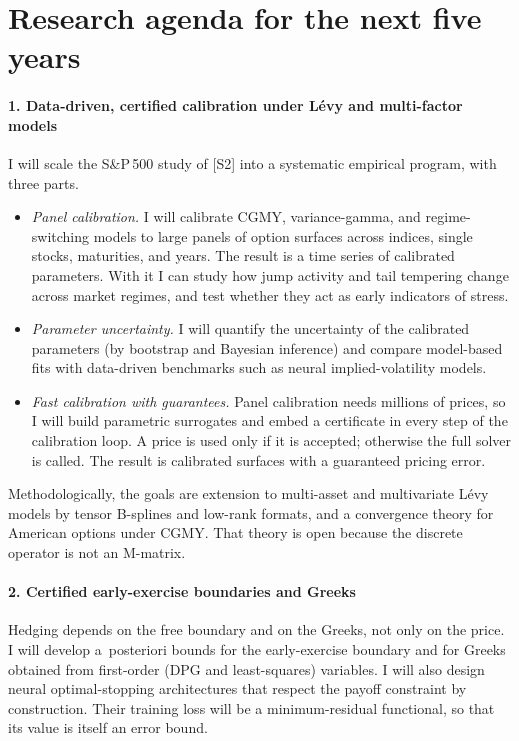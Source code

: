 \documentclass[11pt]{article}
\newcommand{\rc}[1]{\textcolor{accent}{[#1]}}
\begin{document}
\section{Research agenda for the next five years}

\paragraph{1. Data-driven, certified calibration under L\'evy and multi-factor models}
I will scale the S\&P\,500 study of \rc{S2} into a systematic empirical
program, with three parts.
\begin{itemize}
\item \emph{Panel calibration.} I will calibrate CGMY, variance-gamma, and
      regime-switching models to large panels of option surfaces across
      indices, single stocks, maturities, and years. The result is a time
      series of calibrated parameters. With it I can study how jump
      activity and tail tempering change across market regimes, and test
      whether they act as early indicators of stress.
\item \emph{Parameter uncertainty.} I will quantify the uncertainty of the
      calibrated parameters (by bootstrap and Bayesian inference) and
      compare model-based fits with data-driven benchmarks such as neural
      implied-volatility models.
\item \emph{Fast calibration with guarantees.} Panel calibration needs
      millions of prices, so I will build parametric surrogates and embed
      a certificate in every step of the calibration loop. A price is used
      only if it is accepted; otherwise the full solver is called. The
      result is calibrated surfaces with a guaranteed pricing error.
\end{itemize}
Methodologically, the goals are extension to multi-asset and multivariate
L\'evy models by tensor B-splines and low-rank formats, and a convergence
theory for American options under CGMY. That theory is open because the
discrete operator is not an M-matrix.

\paragraph{2. Certified early-exercise boundaries and Greeks}
Hedging depends on the free boundary and on the Greeks, not only on the
price. I will develop a~posteriori bounds for the early-exercise boundary
and for Greeks obtained from first-order (DPG and least-squares)
variables. I will also design neural optimal-stopping architectures that
respect the payoff constraint by construction. Their training loss will be
a minimum-residual functional, so that its value is itself an error bound.
\end{document}
